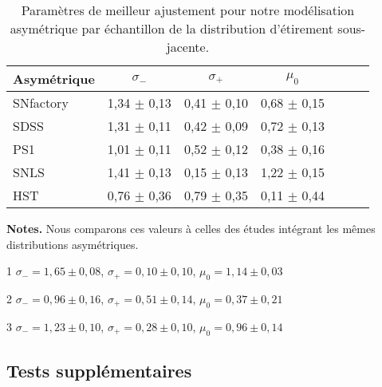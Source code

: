 \documentclass[../main/main.tex]{subfiles}
\begin{document}
\begin{table}
    \centering
    \begin{threeparttable}
        \caption[Paramètres de meilleur ajustement pour notre modélisation
        asymétrique par échantillon de la distribution d'étirement
        sous-jacente]{Paramètres de meilleur ajustement pour notre modélisation
        asymétrique par échantillon de la distribution d'étirement sous-jacente.}
        \label{tab:bbc}
        \begin{tabular}{lcccccc}
        \toprule
        Asymétrique   & $\sigma_{-}$    & $\sigma_{+}$    & $\mu_0$ \\
        \midrule
        SNfactory     & 1,34 $\pm$ 0,13 & 0,41 $\pm$ 0,10 & 0,68 $\pm$ 0,15 \\
        SDSS\tnote{1} & 1,31 $\pm$ 0,11 & 0,42 $\pm$ 0,09 & 0,72 $\pm$ 0,13 \\
        PS1\tnote{2}  & 1,01 $\pm$ 0,11 & 0,52 $\pm$ 0,12 & 0,38 $\pm$ 0,16 \\
        SNLS\tnote{3} & 1,41 $\pm$ 0,13 & 0,15 $\pm$ 0,13 & 1,22 $\pm$ 0,15 \\
        HST           & 0,76 $\pm$ 0,36 & 0,79 $\pm$ 0,35 & 0,11 $\pm$ 0,44 \\
        \bottomrule
        \end{tabular}
        \begin{tablenotes}[flushleft]
            \item\small \textbf{\hspace{-3,2pt}Notes.} Nous comparons ces
                valeurs à celles des études intégrant les mêmes distributions
                asymétriques.
            \item [1]\small $\sigma_{-} = 1,65 \pm 0,08$, $\sigma_{+} = 0,10 \pm
                0,10$, $\mu_0 = 1,14 \pm 0,03$ \citep[Tableau~1,][]{scolnic2016}
            \item [2]\small $\sigma_{-} = 0,96 \pm 0,16$, $\sigma_{+} = 0,51 \pm
                0,14$, $\mu_0 = 0,37 \pm 0,21$ \citep[Tableau~3,][]{scolnic2018}
            \item [3]\small $\sigma_{-} = 1,23 \pm 0,10$, $\sigma_{+} = 0,28 \pm
                0,10$, $\mu_0 = 0,96 \pm 0,14$ \citep[Tableau~1,][]{scolnic2016}
        \end{tablenotes}
    \end{threeparttable}
\end{table}

\subsection{Tests supplémentaires}\label{ssec:testsupp}
\end{document}
